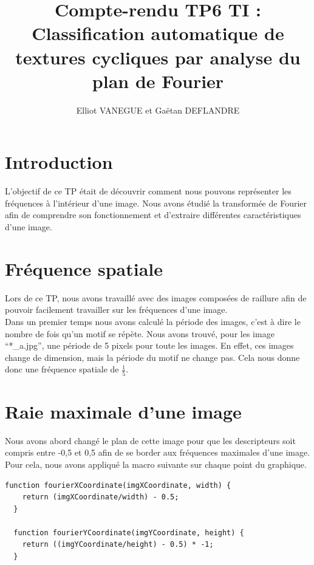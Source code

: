 \documentclass[a4paper,11pt]{article}
\title{Compte-rendu TP6 TI : Classification automatique de textures cycliques par analyse du plan de Fourier}
\author{Elliot VANEGUE et Gaëtan DEFLANDRE}
\begin{document}


  \maketitle
  
  \mbox{}
  \newpage
  \clearpage
  
  \section*{Introduction}
  L'objectif de ce TP était de découvrir comment nous pouvons représenter les fréquences à l'intérieur 
  d'une image. Nous avons étudié la transformée de Fourier afin de comprendre son fonctionnement et 
  d'extraire différentes caractéristiques d'une image.
  
  \section{Fréquence spatiale}
  Lors de ce TP, nous avons travaillé avec des images composées de raillure afin de pouvoir
  facilement travailler sur les fréquences d'une image.\\
  
  Dans un premier temps nous avons calculé la période des images, c'est à dire le nombre de fois 
  qu'un motif se répète. Nous avons trouvé, pour les image \enquote{*\_a.jpg}, une période de 5 pixels pour toute les images. En effet,
  ces images change de dimension, mais la période du motif ne change pas. Cela nous donne donc
  une fréquence spatiale de $\frac{1}{5}$.
  
  \section{Raie maximale d'une image}
  
  Nous avons abord changé le plan de cette image pour que les descripteurs soit compris entre -0,5
  et 0,5 afin de se border aux fréquences maximales d'une image. Pour cela, nous avons appliqué la 
  macro suivante sur chaque point du graphique.
  
  \begin{lstlisting}[caption=Fonctions de passage aux coordonnées dans le plan de Fourier]
  function fourierXCoordinate(imgXCoordinate, width) {
    return (imgXCoordinate/width) - 0.5;
  }

  function fourierYCoordinate(imgYCoordinate, height) {
    return ((imgYCoordinate/height) - 0.5) * -1;
  }
  \end{lstlisting}
  
\end{document}
